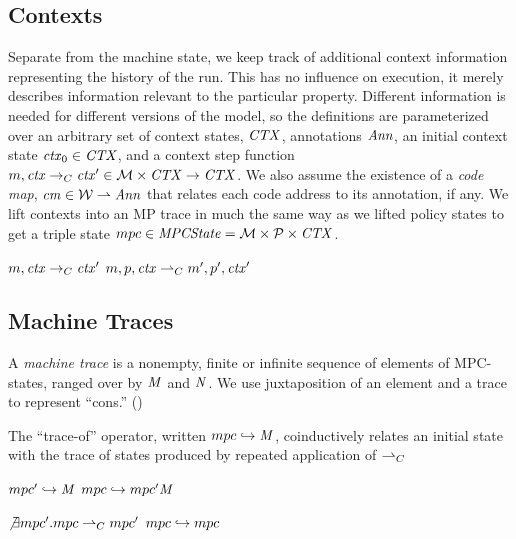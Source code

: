 \documentclass[acmsmall,review,anonymous]{acmart}\settopmatter{printfolios=true,printccs=false,printacmref=false}
\begin{document}
\subsection{Contexts}

Separate from the machine state, we keep track of additional context
information representing the history of the run. This has no influence on execution, it merely
describes information relevant to the particular property. Different information is needed
for different versions of the model, so the definitions are parameterized
over an arbitrary set of context states, \(\mathit{CTX}\), annotations \(\mathit{Ann}\),
an initial context state \(\mathit{ctx}_0 \in \mathit{CTX}\), and a context step function
\(m, \mathit{ctx} \rightarrow_C \mathit{ctx}' \in {\mathcal M} \times \mathit{CTX}
\rightarrow \mathit{CTX}\). We also assume the existence of a \emph{code map},
\(\mathit{cm} \in {\mathcal W} \rightharpoonup \mathit{Ann}\)
that relates each code address to its annotation, if any.
We lift contexts into an MP trace in much the same way as we lifted policy states to get
a triple state \(mpc \in \mathit{MPCState} = {\mathcal M} \times \mathcal{P} \times
\mathit{CTX}\).

              {\(m, \mathit{ctx} \rightarrow_C \mathit{ctx}'\)}
              {\(m,p,\mathit{ctx} \overset{}{\rightharpoonup}_C
                m',p',\mathit{ctx}'\)}

\subsection{Machine Traces}
\label{sec:traces}

A {\em machine trace} is a nonempty, finite or infinite sequence of elements
of MPC-states, ranged over by \(\mathit{M}\) and \(\mathit{N}\).
We use juxtaposition of an element and a trace to represent ``cons.'' ()

The ``trace-of'' operator, written \(mpc \hookrightarrow \mathit{M}\),
coinductively relates an initial state with the trace of states
produced by repeated application of \(\overset{}{\rightharpoonup}_C\)

\begin{center}
\begin{minipage}{.4\textwidth}
            {\(mpc' \hookrightarrow \mathit{M}\)}
            {\(mpc \hookrightarrow mpc' \mathit{M}\)}%
\end{minipage}
\begin{minipage}{.4\textwidth}
\judgment%
         {\(\not\exists mpc'. mpc \overset{}{\rightharpoonup}_C mpc'\)}
         {\(mpc \hookrightarrow mpc\)}
\end{minipage}
\end{center}
%
\end{document}
